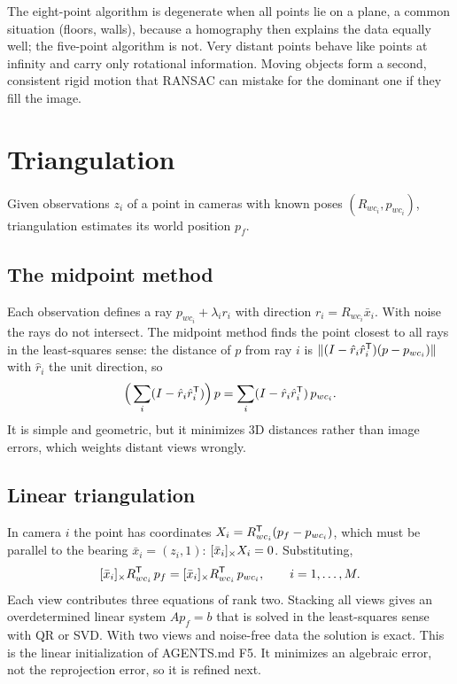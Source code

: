 The eight-point algorithm is degenerate when all points lie on a plane, a common situation (floors, walls), because a homography then explains the data equally well;
the five-point algorithm is not. Very distant points behave like points at infinity and carry only rotational information. Moving objects form a second, consistent
rigid motion that RANSAC can mistake for the dominant one if they fill the image.

\section{Triangulation}
\label{sec:triangulation}

Given observations $z_i$ of a point in cameras with known poses $(R_{wc_i}, p_{wc_i})$, triangulation estimates its world position $p_f$.

\subsection{The midpoint method}

Each observation defines a ray $p_{wc_i} + \lambda_ir_i$ with direction $r_i = R_{wc_i}\bar x_i$. With noise the rays do not intersect. The midpoint method finds the point
closest to all rays in the least-squares sense: the distance of $p$ from ray $i$ is $\|(I - \hat r_i\hat r_i^{\mathsf{T}})(p - p_{wc_i})\|$ with $\hat r_i$ the unit direction, so
\begin{equation}
  \Big(\sum_i(I - \hat r_i\hat r_i^{\mathsf{T}})\Big)\,p = \sum_i(I - \hat r_i\hat r_i^{\mathsf{T}})\,p_{wc_i} .
\end{equation}
It is simple and geometric, but it minimizes 3D distances rather than image errors, which weights distant views wrongly.

\subsection{Linear triangulation}

In camera $i$ the point has coordinates $X_i = R_{wc_i}^{\mathsf{T}}(p_f - p_{wc_i})$, which must be parallel to the bearing $\bar x_i = (z_i, 1)$: $[\bar x_i]_{\times}X_i = 0$. Substituting,
\begin{equation}
  [\bar x_i]_{\times}R_{wc_i}^{\mathsf{T}}\, p_f = [\bar x_i]_{\times}R_{wc_i}^{\mathsf{T}}\, p_{wc_i}, \qquad i = 1,\dots,M .
  \label{eq:dlt}
\end{equation}
Each view contributes three equations of rank two. Stacking all views gives an overdetermined linear system $A p_f = b$ that is solved in the least-squares sense with
QR or SVD. With two views and noise-free data the solution is exact. This is the linear initialization of AGENTS.md F5. It minimizes an algebraic error, not the
reprojection error, so it is refined next.

